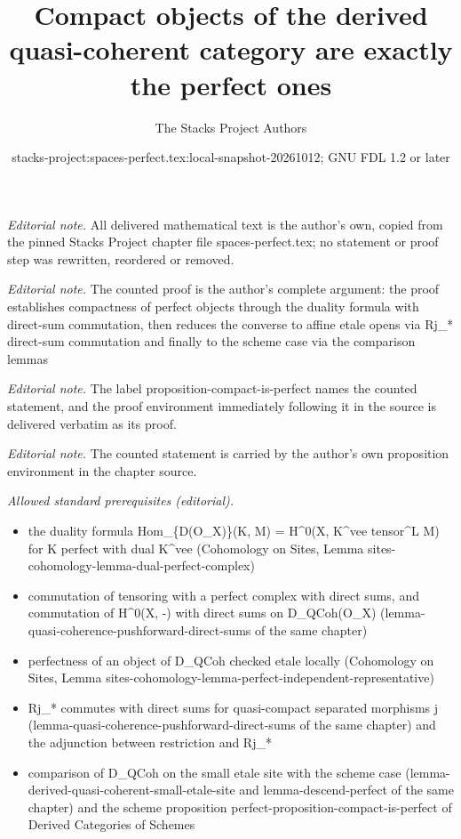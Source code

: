 \documentclass[10pt,a4paper]{amsart}
\title{Compact objects of the derived quasi-coherent category are exactly the perfect ones}
\author{The Stacks Project Authors}
\date{stacks-project:spaces-perfect.tex:local-snapshot-20261012; GNU FDL 1.2 or later}
\theoremstyle{plain}
\theoremstyle{definition}
\theoremstyle{remark}
\numberwithin{equation}{subsection}
\begin{document}
\maketitle
\noindent\textit{Editorial note.} All delivered mathematical text is the author's own, copied from the pinned Stacks Project chapter file spaces-perfect.tex; no statement or proof step was rewritten, reordered or removed.\par\medskip
\noindent\textit{Editorial note.} The counted proof is the author's complete argument: the proof establishes compactness of perfect objects through the duality formula with direct-sum commutation, then reduces the converse to affine etale opens via Rj\_* direct-sum commutation and finally to the scheme case via the comparison lemmas\par\medskip
\noindent\textit{Editorial note.} The label proposition-compact-is-perfect names the counted statement, and the proof environment immediately following it in the source is delivered verbatim as its proof.\par\medskip
\noindent\textit{Editorial note.} The counted statement is carried by the author's own proposition environment in the chapter source.\par\medskip
\noindent\textit{Allowed standard prerequisites (editorial).}\begin{itemize}
\item the duality formula Hom\_\{D(O\_X)\}(K, M) = H\textasciicircum{}0(X, K\textasciicircum{}vee tensor\textasciicircum{}L M) for K perfect with dual K\textasciicircum{}vee (Cohomology on Sites, Lemma sites-cohomology-lemma-dual-perfect-complex)
\item commutation of tensoring with a perfect complex with direct sums, and commutation of H\textasciicircum{}0(X, -) with direct sums on D\_QCoh(O\_X) (lemma-quasi-coherence-pushforward-direct-sums of the same chapter)
\item perfectness of an object of D\_QCoh checked etale locally (Cohomology on Sites, Lemma sites-cohomology-lemma-perfect-independent-representative)
\item Rj\_* commutes with direct sums for quasi-compact separated morphisms j (lemma-quasi-coherence-pushforward-direct-sums of the same chapter) and the adjunction between restriction and Rj\_*
\item comparison of D\_QCoh on the small etale site with the scheme case (lemma-derived-quasi-coherent-small-etale-site and lemma-descend-perfect of the same chapter) and the scheme proposition perfect-proposition-compact-is-perfect of Derived Categories of Schemes
\end{itemize}\medskip
\end{document}
